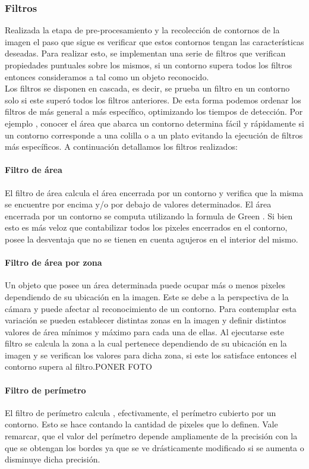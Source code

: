 	

	\subsubsection{Filtros}
	Realizada la etapa de pre-procesamiento y la recolección de contornos de la imagen el paso que sigue es verificar que estos
	contornos tengan las características deseadas. Para realizar esto, se implementan una serie de filtros que verifican propiedades
	puntuales sobre los mismos, si un contorno supera todos los filtros entonces consideramos a tal como un objeto reconocido. \\
	\indent Los filtros se disponen en cascada, es decir, se prueba un filtro en un contorno solo si este superó todos los filtros 
	anteriores. De esta forma podemos ordenar los filtros de más general a más específico, optimizando los tiempos de detección. Por ejemplo , conocer 
	el área que abarca un contorno determina fácil y rápidamente si un contorno corresponde a una colilla o a un plato evitando la ejecución
	de filtros más específicos. A continuación detallamos los filtros realizados:
	\paragraph{Filtro de área}
	El filtro de área calcula el área encerrada por un contorno y verifica que la misma se encuentre por encima y/o por debajo
	de valores determinados. El área encerrada por un contorno se computa utilizando la formula de Green \cite{greenwolfram}.
	Si bien esto es más veloz que contabilizar todos los pixeles encerrados en el contorno, posee la desventaja que no se tienen en cuenta agujeros
	en el interior del mismo.
	\paragraph{Filtro de área por zona}
	Un objeto que posee un área determinada puede ocupar más o menos pixeles dependiendo de su ubicación en la imagen. Este se debe a la 
	perspectiva de la cámara y puede afectar al reconocimiento de un contorno. Para contemplar esta variación se pueden establecer distintas
	zonas en la imagen y definir distintos valores de área mínimos y máximo para cada una de ellas. Al ejecutarse este filtro se calcula la
	zona a la cual pertenece dependiendo de su ubicación en la imagen y se verifican los valores para dicha zona, si este los satisface entonces
	el contorno supera al filtro.PONER FOTO
	\paragraph{Filtro de perímetro}
	El filtro de perímetro calcula , efectivamente, el perímetro cubierto por un contorno. Esto se hace contando la cantidad de pixeles que lo definen.
	Vale remarcar, que el valor del perímetro depende ampliamente de la precisión con la que se obtengan los bordes ya que se ve drásticamente modificado 
	si se aumenta o disminuye dicha precisión.
